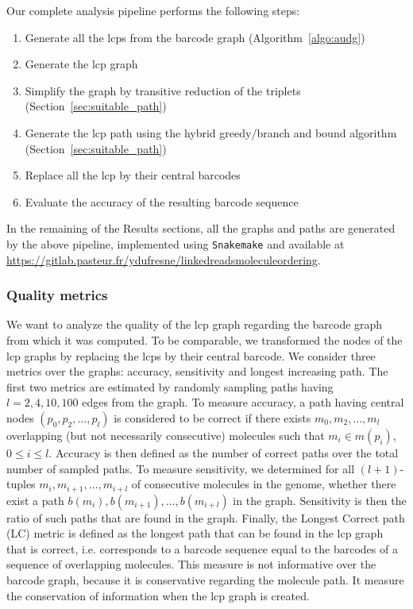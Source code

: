 \documentclass[a4paper,UKenglish,cleveref, autoref, thm-restate,authorcolumns]{lipics-v2019}
\begin{document}
Our complete analysis pipeline performs the following steps:
\begin{enumerate}
    \item Generate all the lcps from the barcode graph (Algorithm~\ref{algo:audg})
    \item Generate the lcp graph
    \item Simplify the graph by transitive reduction of the triplets (Section~\ref{sec:suitable_path})
    \item Generate the lcp path using the hybrid greedy/branch and bound algorithm (Section~\ref{sec:suitable_path})
    \item Replace all the lcp by their central barcodes
    \item Evaluate the accuracy of the resulting barcode sequence
\end{enumerate}

In the remaining of the Results sections, all the graphs and paths are generated by the above  pipeline, implemented using \texttt{Snakemake} and available at \url{https://gitlab.pasteur.fr/ydufresne/linkedreadsmoleculeordering}.

\subsubsection*{Quality metrics}

We want to analyze the quality of the lcp graph regarding the barcode graph from which it was computed.
To be comparable, we transformed the nodes of the lcp graphs by replacing the lcps by their central barcode.
We consider three metrics over the graphs: accuracy, sensitivity and longest increasing path. The first two metrics are estimated by randomly sampling paths having $l=2,4,10,100$ edges from the graph. To measure accuracy, a path having central nodes $(p_0,p_2,\ldots,p_l)$ is considered to be correct if there exists $m_0,m_2,\ldots,m_l$ overlapping (but not necessarily consecutive) molecules such that $m_i \in m(p_i)$, $0\leq i\leq l$. Accuracy is then defined as the number of correct paths over the total number of sampled paths. 
To measure sensitivity, we determined for all $(l+1)$-tuples $m_i,m_{i+1},\ldots,m_{i+l}$ of consecutive molecules in the genome, whether there exist a path $b(m_i),b(m_{i+1}),\ldots,b(m_{i+l})$ in the graph. Sensitivity is then the ratio of such paths that are found in the graph.   
Finally, the Longest Correct path (LC) metric is defined as the longest path that can be found in the lcp graph that is correct, i.e. corresponds to a barcode sequence equal to the barcodes of a sequence of overlapping molecules. This measure is not informative over the barcode graph, because it is conservative regarding the molecule path. It measure the conservation of information when the lcp graph is created.
  
\end{document}
